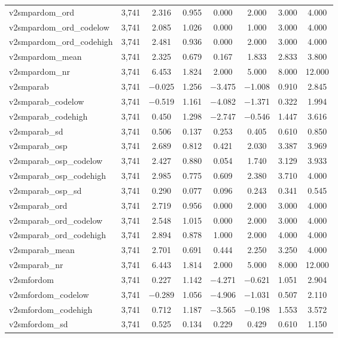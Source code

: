 \begin{table}[!htbp]
\begin{tabular}{@{\extracolsep{5pt}}lccccccc}
v2smpardom\_ord & 3,741 & 2.316 & 0.955 & 0.000 & 2.000 & 3.000 & 4.000 \\ 
v2smpardom\_ord\_codelow & 3,741 & 2.085 & 1.026 & 0.000 & 1.000 & 3.000 & 4.000 \\ 
v2smpardom\_ord\_codehigh & 3,741 & 2.481 & 0.936 & 0.000 & 2.000 & 3.000 & 4.000 \\ 
v2smpardom\_mean & 3,741 & 2.325 & 0.679 & 0.167 & 1.833 & 2.833 & 3.800 \\ 
v2smpardom\_nr & 3,741 & 6.453 & 1.824 & 2.000 & 5.000 & 8.000 & 12.000 \\ 
v2smparab & 3,741 & $-$0.025 & 1.256 & $-$3.475 & $-$1.008 & 0.910 & 2.845 \\ 
v2smparab\_codelow & 3,741 & $-$0.519 & 1.161 & $-$4.082 & $-$1.371 & 0.322 & 1.994 \\ 
v2smparab\_codehigh & 3,741 & 0.450 & 1.298 & $-$2.747 & $-$0.546 & 1.447 & 3.616 \\ 
v2smparab\_sd & 3,741 & 0.506 & 0.137 & 0.253 & 0.405 & 0.610 & 0.850 \\ 
v2smparab\_osp & 3,741 & 2.689 & 0.812 & 0.421 & 2.030 & 3.387 & 3.969 \\ 
v2smparab\_osp\_codelow & 3,741 & 2.427 & 0.880 & 0.054 & 1.740 & 3.129 & 3.933 \\ 
v2smparab\_osp\_codehigh & 3,741 & 2.985 & 0.775 & 0.609 & 2.380 & 3.710 & 4.000 \\ 
v2smparab\_osp\_sd & 3,741 & 0.290 & 0.077 & 0.096 & 0.243 & 0.341 & 0.545 \\ 
v2smparab\_ord & 3,741 & 2.719 & 0.956 & 0.000 & 2.000 & 3.000 & 4.000 \\ 
v2smparab\_ord\_codelow & 3,741 & 2.548 & 1.015 & 0.000 & 2.000 & 3.000 & 4.000 \\ 
v2smparab\_ord\_codehigh & 3,741 & 2.894 & 0.878 & 1.000 & 2.000 & 4.000 & 4.000 \\ 
v2smparab\_mean & 3,741 & 2.701 & 0.691 & 0.444 & 2.250 & 3.250 & 4.000 \\ 
v2smparab\_nr & 3,741 & 6.443 & 1.814 & 2.000 & 5.000 & 8.000 & 12.000 \\ 
v2smfordom & 3,741 & 0.227 & 1.142 & $-$4.271 & $-$0.621 & 1.051 & 2.904 \\ 
v2smfordom\_codelow & 3,741 & $-$0.289 & 1.056 & $-$4.906 & $-$1.031 & 0.507 & 2.110 \\ 
v2smfordom\_codehigh & 3,741 & 0.712 & 1.187 & $-$3.565 & $-$0.198 & 1.553 & 3.572 \\ 
v2smfordom\_sd & 3,741 & 0.525 & 0.134 & 0.229 & 0.429 & 0.610 & 1.150 \\ 

\end{tabular}
\end{table}
